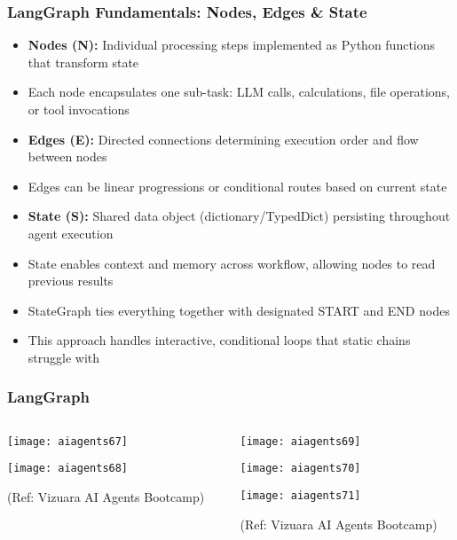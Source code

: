\begin{frame}[fragile]\frametitle{LangGraph Fundamentals: Nodes, Edges \& State}

      \begin{itemize}
        \item \textbf{Nodes (N):} Individual processing steps implemented as Python functions that transform state
        \item Each node encapsulates one sub-task: LLM calls, calculations, file operations, or tool invocations
        \item \textbf{Edges (E):} Directed connections determining execution order and flow between nodes
        \item Edges can be linear progressions or conditional routes based on current state
        \item \textbf{State (S):} Shared data object (dictionary/TypedDict) persisting throughout agent execution
        \item State enables context and memory across workflow, allowing nodes to read previous results
        \item StateGraph ties everything together with designated START and END nodes
        \item This approach handles interactive, conditional loops that static chains struggle with
      \end{itemize}
  

\end{frame}

\begin{frame}[fragile]\frametitle{LangGraph}
\begin{columns}
    \begin{column}[T]{0.5\linewidth}
        \begin{center}
		
        \texttt{[image: aiagents67]}
		
        \texttt{[image: aiagents68]}
		
		
		{\tiny (Ref: Vizuara AI Agents Bootcamp)}
				
        \end{center}    
    \end{column}
    \begin{column}[T]{0.5\linewidth}
        \begin{center}
        \texttt{[image: aiagents69]}
		
        \texttt{[image: aiagents70]}
		
        \texttt{[image: aiagents71]}
		
		{\tiny (Ref: Vizuara AI Agents Bootcamp)}
				
        \end{center}    
    \end{column}
  \end{columns}
\end{frame}

